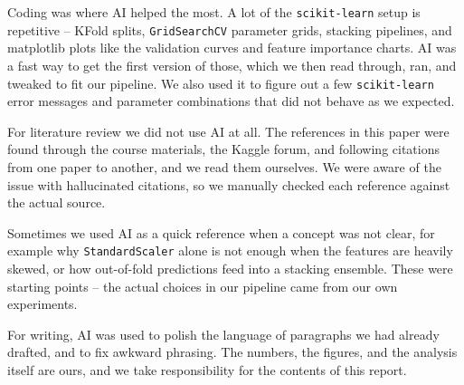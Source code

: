 \documentclass{article}
\begin{document}
Coding was where AI helped the most. A lot of the
\texttt{scikit-learn} setup is repetitive -- KFold splits,
\texttt{GridSearchCV} parameter grids, stacking pipelines, and
matplotlib plots like the validation curves and feature importance
charts. AI was a fast way to get the first version of those, which
we then read through, ran, and tweaked to fit our pipeline. We
also used it to figure out a few \texttt{scikit-learn} error
messages and parameter combinations that did not behave as we
expected.

For literature review we did not use AI at all. The references in
this paper were found through the course materials, the Kaggle
forum, and following citations from one paper to another, and we
read them ourselves. We were aware of the issue with hallucinated
citations, so we manually checked each reference against the
actual source.

Sometimes we used AI as a quick reference when a concept was not
clear, for example why \texttt{StandardScaler} alone is not enough
when the features are heavily skewed, or how out-of-fold
predictions feed into a stacking ensemble. These were starting
points -- the actual choices in our pipeline came from our own
experiments.

For writing, AI was used to polish the language of paragraphs we
had already drafted, and to fix awkward phrasing. The numbers, the
figures, and the analysis itself are ours, and we take
responsibility for the contents of this report.



\end{document}
